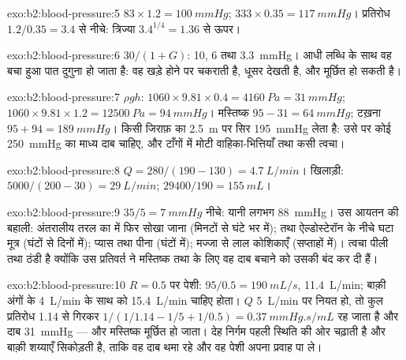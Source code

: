 \begin{solution}{exo:b2:blood-pressure:5}
$83\times 1.2 = \qty{100}{mmHg}$; $333\times 0.35 = \qty{117}{mmHg}$।
प्रतिरोध $1.2/0.35 = 3.4$ से नीचे: त्रिज्या $3.4^{1/4} =
1.36$ से ऊपर।
\end{solution}

\begin{solution}{exo:b2:blood-pressure:6}
$30/(1 + G)$: 10, 6 तथा \qty{3.3}{mmHg}। आधी लब्धि के साथ वह
बचा हुआ पात दुगुना हो जाता है: वह खड़े होने पर चकराती है, धूसर देखती है, और
मूर्छित हो सकती है।
\end{solution}

\begin{solution}{exo:b2:blood-pressure:7}
$\rho g h$: $1060\times 9.81\times 0.4 = \qty{4160}{Pa} =
\qty{31}{mmHg}$; $1060\times 9.81\times 1.2 = \qty{12500}{Pa} =
\qty{94}{mmHg}$। मस्तिष्क $95 - 31 = \qty{64}{mmHg}$; टख़ना $95 + 94 =
\qty{189}{mmHg}$। किसी जिराफ़ का \qty{2.5}{m} पर सिर
\qty{195}{mmHg} लेता है: उसे  पर कोई \qty{250}{mmHg} का माध्य दाब
चाहिए, और टाँगों में मोटी वाहिका-भित्तियाँ तथा कसी त्वचा।
\end{solution}

\begin{solution}{exo:b2:blood-pressure:8}
$Q = 280/(190 - 130) = \qty{4.7}{L/min}$। खिलाड़ी: $5000/(200 - 30) =
\qty{29}{L/min}$;  $\num{29400}/190 = \qty{155}{mL}$।
\end{solution}

\begin{solution}{exo:b2:blood-pressure:9}
$35/5 = \qty{7}{mmHg}$ नीचे: यानी लगभग \qty{88}{mmHg}। उस
आयतन की बहाली: अंतरालीय तरल का  में फिर सोखा जाना
(मिनटों से घंटे भर में);  तथा
ऐल्डोस्टेरॉन के नीचे घटा मूत्र (घंटों से दिनों में); प्यास तथा पीना (घंटों में); मज्जा से
लाल कोशिकाएँ (सप्ताहों में)। त्वचा पीली तथा ठंडी है क्योंकि उस
प्रतिवर्त ने मस्तिष्क तथा  के लिए वह दाब बचाने को उसकी  बंद
कर दी हैं।
\end{solution}

\begin{solution}{exo:b2:blood-pressure:10}
$R = 0.5$ पर पेशी: $95/0.5 = \qty{190}{mL/s}$, \qty{11.4}{L/min};
बाक़ी अंगों के \qty{4}{L/min} के साथ  को
\qty{15.4}{L/min} चाहिए होता। $Q$ \qty{5}{L/min} पर नियत हो, तो कुल
प्रतिरोध 1.14 से गिरकर $1/(1/1.14 - 1/5 + 1/0.5) =
\qty{0.37}{mmHg.s/mL}$ रह जाता है और दाब \qty{31}{mmHg} --- और
मस्तिष्क मूर्छित हो जाता। देह निर्गम पहली स्थिति की ओर चढ़ाती है
और बाक़ी शय्याएँ सिकोड़ती है, ताकि वह दाब थमा रहे और वह
पेशी अपना प्रवाह पा ले।
\end{solution}

